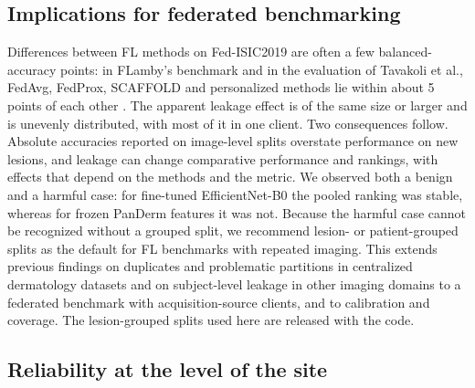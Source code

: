 \subsection{Implications for federated benchmarking}

Differences between FL methods on Fed-ISIC2019 are often a few balanced-accuracy points: in FLamby's
benchmark and in the evaluation of Tavakoli et al., FedAvg, FedProx, SCAFFOLD and personalized methods lie
within about 5 points of each other \cite{flamby2022,tavakoli2024fendafl}. The apparent leakage effect is
of the same size or larger and is unevenly distributed, with most of it in one client. Two consequences
follow. Absolute accuracies reported on image-level splits overstate performance on new lesions, and
leakage can change comparative performance and rankings, with effects that depend on the methods and the
metric. We observed both a benign and a harmful case: for fine-tuned EfficientNet-B0 the pooled ranking was
stable, whereas for frozen PanDerm features it was not. Because the harmful case cannot be recognized
without a grouped split, we recommend lesion- or patient-grouped splits as the default for FL benchmarks
with repeated imaging. This extends previous findings on duplicates and problematic partitions in
centralized dermatology datasets \cite{cassidy2022isic,groger2023reliable,abhishek2025dermamnist} and on
subject-level leakage in other imaging domains \cite{bussola2021tiles,yagis2021leakage} to a federated
benchmark with acquisition-source clients, and to calibration and coverage. The lesion-grouped splits used
here are released with the code.

\subsection{Reliability at the level of the site}

